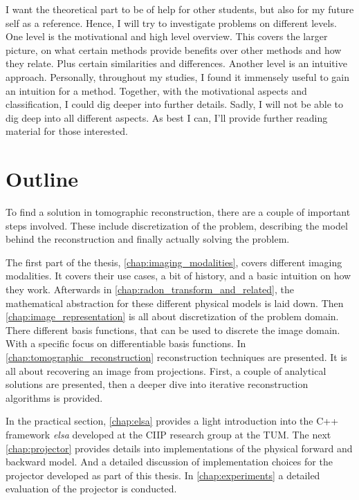 I want the theoretical part to be of help for other students, but also for my future self as a
reference. Hence, I will try to investigate problems on different levels. One level is the
motivational and high level overview. This covers the larger picture, on what certain methods
provide benefits over other methods and how they relate. Plus certain similarities and differences.
Another level is an intuitive approach. Personally, throughout my studies, I found it immensely
useful to gain an intuition for a method. Together, with the motivational aspects and classification,
I could dig deeper into further details. Sadly, I will not be able to dig deep into all different
aspects. As best I can, I'll provide further reading material for those interested.

\section{Outline}\label{sec:outline}

To find a solution in tomographic reconstruction, there are a couple of important steps involved.
These include discretization of the problem, describing the model behind the reconstruction and
finally actually solving the problem.

The first part of the thesis, \autoref{chap:imaging_modalities}, covers different imaging
modalities. It covers their use cases, a bit of history, and a basic intuition on how they
work. Afterwards in \autoref{chap:radon_transform_and_related}, the mathematical abstraction for
these different physical models is laid down. Then \autoref{chap:image_representation} is all about
discretization of the problem domain. There different basis functions, that can be used to discrete
the image domain. With a specific focus on differentiable basis functions. In
\autoref{chap:tomographic_reconstruction} reconstruction techniques are presented. It is all about
recovering an image from projections. First, a couple of analytical solutions are presented, then a
deeper dive into iterative reconstruction algorithms is provided.

In the practical section, \autoref{chap:elsa} provides a light introduction into the C++ framework
\textit{elsa} developed at the \gls{CIIP} research group at the \gls{TUM}. The
next \autoref{chap:projector} provides details into implementations of the physical forward and
backward model. And a detailed discussion of
implementation choices for the projector developed as part of this thesis. In
\autoref{chap:experiments} a detailed evaluation of the projector is conducted.

